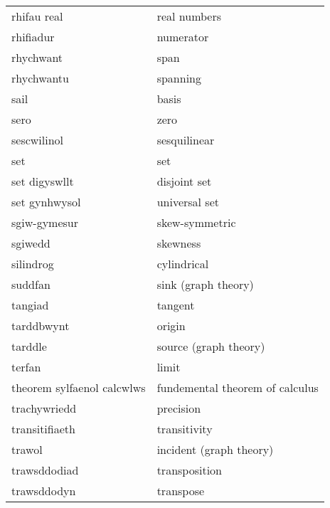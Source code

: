 \begin{supertabular}{p{0.22\textwidth}p{0.22\textwidth}}
                     rhifau real &                      real numbers \\
                       rhifiadur &                         numerator \\
                       rhychwant &                              span \\
                      rhychwantu &                          spanning \\
                            sail &                             basis \\
                            sero &                              zero \\
                     sescwilinol &                      sesquilinear \\
                             set &                               set \\
                   set digyswllt &                      disjoint set \\
                   set gynhwysol &                     universal set \\
                    sgiw-gymesur &                    skew-symmetric \\
                         sgiwedd &                          skewness \\
                       silindrog &                       cylindrical \\
                         suddfan &               sink (graph theory) \\
                         tangiad &                           tangent \\
                      tarddbwynt &                            origin \\
                         tarddle &             source (graph theory) \\
                          terfan &                             limit \\
      theorem sylfaenol calcwlws &   fundemental theorem of calculus \\
                    trachywriedd &                         precision \\
                  transitifiaeth &                      transitivity \\
                          trawol &           incident (graph theory) \\
                    trawsddodiad &                     transposition \\
                     trawsddodyn &                         transpose \\

\end{supertabular}
